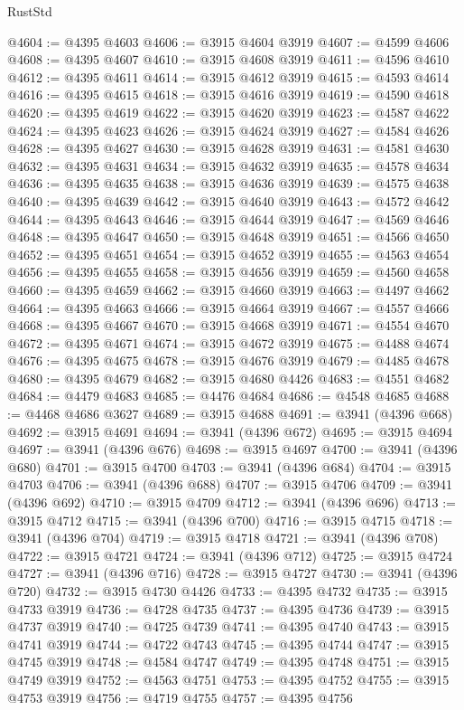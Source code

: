\begin{lexlean}{RustStd}
\begin{coremodule}
@4604 := @4395 @4603
@4606 := @3915 @4604 @3919
@4607 := @4599 @4606
@4608 := @4395 @4607
@4610 := @3915 @4608 @3919
@4611 := @4596 @4610
@4612 := @4395 @4611
@4614 := @3915 @4612 @3919
@4615 := @4593 @4614
@4616 := @4395 @4615
@4618 := @3915 @4616 @3919
@4619 := @4590 @4618
@4620 := @4395 @4619
@4622 := @3915 @4620 @3919
@4623 := @4587 @4622
@4624 := @4395 @4623
@4626 := @3915 @4624 @3919
@4627 := @4584 @4626
@4628 := @4395 @4627
@4630 := @3915 @4628 @3919
@4631 := @4581 @4630
@4632 := @4395 @4631
@4634 := @3915 @4632 @3919
@4635 := @4578 @4634
@4636 := @4395 @4635
@4638 := @3915 @4636 @3919
@4639 := @4575 @4638
@4640 := @4395 @4639
@4642 := @3915 @4640 @3919
@4643 := @4572 @4642
@4644 := @4395 @4643
@4646 := @3915 @4644 @3919
@4647 := @4569 @4646
@4648 := @4395 @4647
@4650 := @3915 @4648 @3919
@4651 := @4566 @4650
@4652 := @4395 @4651
@4654 := @3915 @4652 @3919
@4655 := @4563 @4654
@4656 := @4395 @4655
@4658 := @3915 @4656 @3919
@4659 := @4560 @4658
@4660 := @4395 @4659
@4662 := @3915 @4660 @3919
@4663 := @4497 @4662
@4664 := @4395 @4663
@4666 := @3915 @4664 @3919
@4667 := @4557 @4666
@4668 := @4395 @4667
@4670 := @3915 @4668 @3919
@4671 := @4554 @4670
@4672 := @4395 @4671
@4674 := @3915 @4672 @3919
@4675 := @4488 @4674
@4676 := @4395 @4675
@4678 := @3915 @4676 @3919
@4679 := @4485 @4678
@4680 := @4395 @4679
@4682 := @3915 @4680 @4426
@4683 := @4551 @4682
@4684 := @4479 @4683
@4685 := @4476 @4684
@4686 := @4548 @4685
@4688 := @4468 @4686 @3627
@4689 := @3915 @4688
@4691 := @3941 (@4396 @668)
@4692 := @3915 @4691
@4694 := @3941 (@4396 @672)
@4695 := @3915 @4694
@4697 := @3941 (@4396 @676)
@4698 := @3915 @4697
@4700 := @3941 (@4396 @680)
@4701 := @3915 @4700
@4703 := @3941 (@4396 @684)
@4704 := @3915 @4703
@4706 := @3941 (@4396 @688)
@4707 := @3915 @4706
@4709 := @3941 (@4396 @692)
@4710 := @3915 @4709
@4712 := @3941 (@4396 @696)
@4713 := @3915 @4712
@4715 := @3941 (@4396 @700)
@4716 := @3915 @4715
@4718 := @3941 (@4396 @704)
@4719 := @3915 @4718
@4721 := @3941 (@4396 @708)
@4722 := @3915 @4721
@4724 := @3941 (@4396 @712)
@4725 := @3915 @4724
@4727 := @3941 (@4396 @716)
@4728 := @3915 @4727
@4730 := @3941 (@4396 @720)
@4732 := @3915 @4730 @4426
@4733 := @4395 @4732
@4735 := @3915 @4733 @3919
@4736 := @4728 @4735
@4737 := @4395 @4736
@4739 := @3915 @4737 @3919
@4740 := @4725 @4739
@4741 := @4395 @4740
@4743 := @3915 @4741 @3919
@4744 := @4722 @4743
@4745 := @4395 @4744
@4747 := @3915 @4745 @3919
@4748 := @4584 @4747
@4749 := @4395 @4748
@4751 := @3915 @4749 @3919
@4752 := @4563 @4751
@4753 := @4395 @4752
@4755 := @3915 @4753 @3919
@4756 := @4719 @4755
@4757 := @4395 @4756

\end{coremodule}
\end{lexlean}
